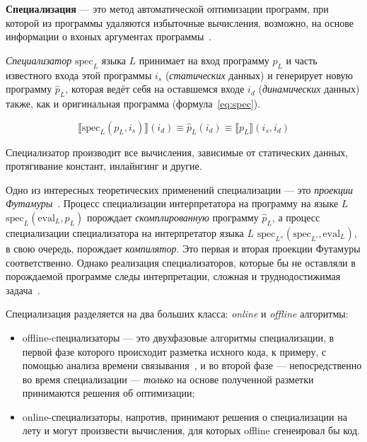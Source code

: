 {\bf Специализация} --- это метод автоматической оптимизации программ,
при которой из программы удаляются избыточные вычисления,
возможно, на основе информации о вхоных аргументах программы~\cite{jones}.


{\it Специализатор} $\text{spec}_L$ языка $L$ принимает на вход программу $p_L$ и часть известного входа этой
программы $i_s$ (\emph{статических} данных) и генерирует новую программу $\hat{p}_L$, которая ведёт себя на оставшемся
входе $i_d$ (\emph{динамических} данных) также, как и оригинальная программа (формула~\ref{eq:spec}).

\begin{equation}
  \llbracket \text{spec}_L(p_L, i_s) \rrbracket (i_d) \equiv \hat{p}_L (i_d) \equiv \llbracket p_L \rrbracket (i_s, i_d)
\label{eq:spec}
\end{equation}

Специализатор производит все вычисления, зависимые от статических данных,
протягивание констант, инлайнгинг и другие.

Одно из интересных теоретических применений специализации --- это
\emph{проекции Футамуры}~\cite{futamura}. Процесс специализации интерпретатора
на программу на языке $L$ $\text{spec}_L(\text{eval}_L, p_L)$
порождает \emph{скомплированную} программу $\hat{p}_L$, а процесс специализации
специализатора на интерпретатор языка $L$
$\text{spec}_{L''}(\text{spec}_{L'}, \text{eval}_L)$, в свою очередь,
порождает \emph{компилятор}. Это первая и вторая проекции Футамуры
соответственно. Однако реализация специализаторов, которые бы не оставляли
в порождаемой программе следы интерпретации, сложная и труднодостижимая
задача~\cite{jones}.

Специализация разделяется на два больших класса: \emph{online} и \emph{offline}
алгоритмы:
\begin{itemize}
\item offline-cпециализаторы --- это двухфазовые алгоритмы специализации,
     в первой фазе которого происходит разметка исхного кода, к примеру,
     с помощью анализа времени связывания~\cite{jones}, и во второй
     фазе --- непосредственно во время специализации --- \emph{только}
     на основе полученной разметки принимаются решения об оптимизации;
\item online-специализаторы, напротив, принимают решения о специализации
      на лету и могут произвести вычисления, для которых offline сгенеировал
      бы код.
\end{itemize}

